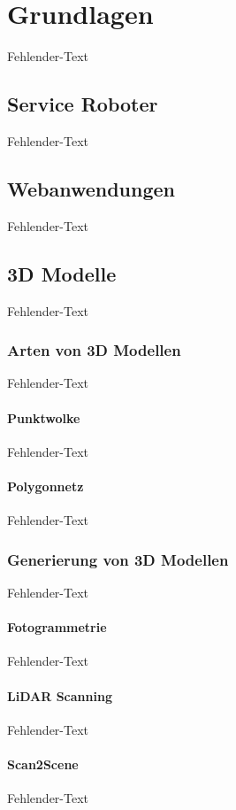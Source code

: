 \newpage
\section{Grundlagen} \label{Grundlagen}
Fehlender-Text

\subsection{Service Roboter}
Fehlender-Text


\newpage
\subsection{Webanwendungen}
Fehlender-Text


\newpage
\subsection{3D Modelle}
Fehlender-Text

\subsubsection{Arten von 3D Modellen}
Fehlender-Text

\paragraph{Punktwolke}
Fehlender-Text

\paragraph{Polygonnetz}
Fehlender-Text


\subsubsection{Generierung von 3D Modellen}
Fehlender-Text

\paragraph{Fotogrammetrie}
Fehlender-Text

\paragraph{LiDAR Scanning}
Fehlender-Text

\paragraph{Scan2Scene}
Fehlender-Text

